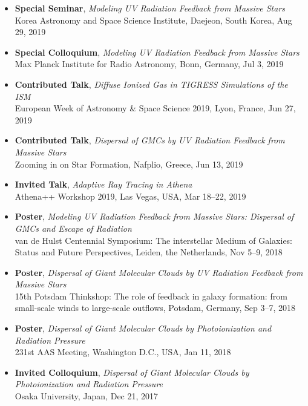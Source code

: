 \documentclass[11pt,letterpaper,roman]{moderncv}        %
\begin{document}
\begin{itemize}
{    Massive Stars}\\ The Self-organized Star Formation Process, Institut Pascal,
  Orsay, France, Sep 30, 2019
\item \textbf{Special Seminar}, \textit{Modeling UV Radiation Feedback from
    Massive Stars}\\ Korea Astronomy and Space Science Institute, Daejeon, South
  Korea, Aug 29, 2019
\item \textbf{Special Colloquium}, \textit{Modeling UV Radiation Feedback from
    Massive Stars}\\ Max Planck Institute for Radio Astronomy, Bonn, Germany,
  Jul 3, 2019
\item \textbf{Contributed Talk}, \textit{Diffuse Ionized Gas in TIGRESS
    Simulations of the ISM}\\ European Week of Astronomy \& Space Science 2019,
  Lyon, France, Jun 27, 2019
\item \textbf{Contributed Talk}, \textit{Dispersal of GMCs by UV Radiation
    Feedback from Massive Stars}\\ Zooming in on Star Formation, Nafplio,
  Greece, Jun 13, 2019
\item \textbf{Invited Talk}, \textit{Adaptive Ray Tracing in {\textit Athena}}\\
  Athena++ Workshop 2019, Las Vegas, USA, Mar 18--22, 2019
\item \textbf{Poster}, \textit{Modeling UV Radiation Feedback from Massive
    Stars: Dispersal of GMCs and Escape of Radiation}\\ van de Hulst Centennial
  Symposium: The interstellar Medium of Galaxies: Status and Future
  Perspectives, Leiden, the Netherlands, Nov 5--9, 2018
\item \textbf{Poster}, \textit{Dispersal of Giant Molecular Clouds by UV Radiation
    Feedback from Massive Stars}\\ 15th Potsdam Thinkshop: The role of feedback
  in galaxy formation: from small-scale winds to large-scale outflows, Potsdam,
  Germany, Sep 3--7, 2018
\item \textbf{Poster}, \textit{Dispersal of Giant Molecular Clouds by
    Photoionization and Radiation Pressure}\\ 231st AAS Meeting,
  Washington D.C., USA, Jan 11, 2018
\item \textbf{Invited Colloquium}, \textit{Dispersal of Giant Molecular Clouds by
    Photoionization and Radiation Pressure}\\ Osaka University, Japan,
  Dec 21, 2017

\end{itemize}
\end{document}
